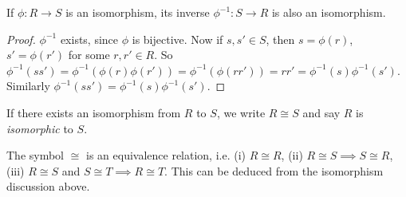 \begin{Lemma}
  If $\phi : R \to S$ is an isomorphism, its inverse $\phi^{-1} : S \to R$
  is also an isomorphism.
\end{Lemma}

\begin{proof}
  $\phi^{-1}$ exists, since $\phi$ is bijective.  Now if $s, s' \in S$, then $s =
  \phi(r)$, $s' = \phi(r')$ for some $r, r' \in R$.  So $\phi^{-1}(ss') =
  \phi^{-1}(\phi(r)\phi(r')) = \phi^{-1}(\phi(rr')) = rr' =
  \phi^{-1}(s)\phi^{-1}(s')$. Similarly $\phi^{-1}(ss') =
  \phi^{-1}(s)\phi^{-1}(s')$.
\end{proof}

\begin{Def}
  If there exists an isomorphism from $R$ to $S$, we write $R \cong S$
  and say $R$ is \emph{isomorphic} to $S$.
\end{Def}

The symbol $\cong$ is an equivalence relation, i.e. (i) $R \cong R$, (ii) $R
\cong S \implies S \cong R$, (iii) $R \cong S$ and $S \cong T \implies R \cong
T$.  This can be deduced from the isomorphism discussion above.

